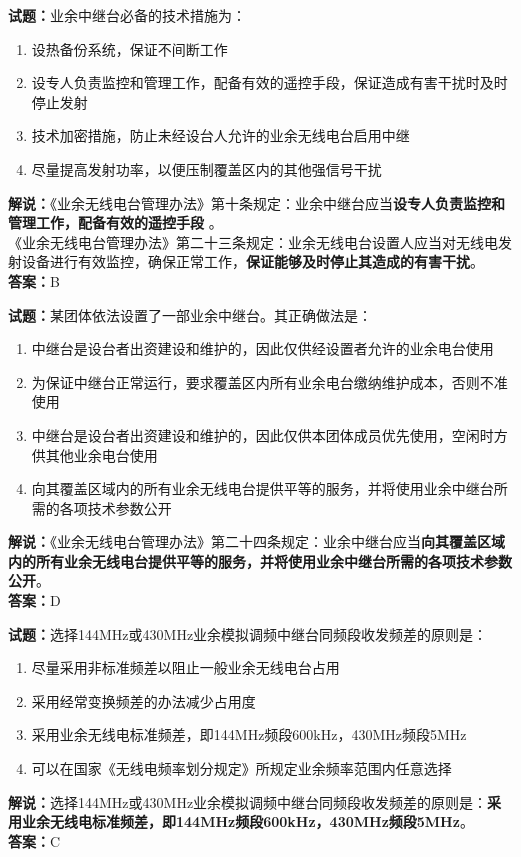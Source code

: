 \documentclass{ctexbook}
\begin{document}
\noindent\textbf{试题：}业余中继台必备的技术措施为：
\begin{enumerate}[leftmargin=3em]
\item 设热备份系统，保证不间断工作
\item 设专人负责监控和管理工作，配备有效的遥控手段，保证造成有害干扰时及时停止发射
\item 技术加密措施，防止未经设台人允许的业余无线电台启用中继
\item 尽量提高发射功率，以便压制覆盖区内的其他强信号干扰
\end{enumerate}
\noindent\textbf{解说：}《业余无线电台管理办法》第十条规定：业余中继台应当\textbf{设专人负责监控和管理工作，配备有效的遥控手段 }。\\
《业余无线电台管理办法》第二十三条规定：业余无线电台设置人应当对无线电发射设备进行有效监控，确保正常工作，\textbf{保证能够及时停止其造成的有害干扰}。 \\\noindent\textbf{答案：}B

\bigskip




\noindent\textbf{试题：}某团体依法设置了一部业余中继台。其正确做法是：
\begin{enumerate}[leftmargin=3em]
\item 中继台是设台者出资建设和维护的，因此仅供经设置者允许的业余电台使用
\item 为保证中继台正常运行，要求覆盖区内所有业余电台缴纳维护成本，否则不准使用
\item 中继台是设台者出资建设和维护的，因此仅供本团体成员优先使用，空闲时方供其他业余电台使用
\item 向其覆盖区域内的所有业余无线电台提供平等的服务，并将使用业余中继台所需的各项技术参数公开
\end{enumerate}
\noindent\textbf{解说：}《业余无线电台管理办法》第二十四条规定：业余中继台应当\textbf{向其覆盖区域内的所有业余无线电台提供平等的服务，并将使用业余中继台所需的各项技术参数公开}。\\\noindent\textbf{答案：}D

\bigskip




\noindent\textbf{试题：}选择144\unit{\MHz}或430\unit{\MHz}业余模拟调频中继台同频段收发频差的原则是：
\begin{enumerate}[leftmargin=3em]
\item 尽量采用非标准频差以阻止一般业余无线电台占用
\item 采用经常变换频差的办法减少占用度
\item 采用业余无线电标准频差，即144\unit{\MHz}频段600\unit{\kHz}，430\unit{\MHz}频段5\unit{\MHz}
\item 可以在国家《无线电频率划分规定》所规定业余频率范围内任意选择
\end{enumerate}
\noindent\textbf{解说：}选择144\unit{\MHz}或430\unit{\MHz}业余模拟调频中继台同频段收发频差的原则是：\textbf{采用业余无线电标准频差，即144\unit{\MHz}频段600\unit{\kHz}，430\unit{\MHz}频段5\unit{\MHz}}。\\\noindent\textbf{答案：}C
\end{document}
